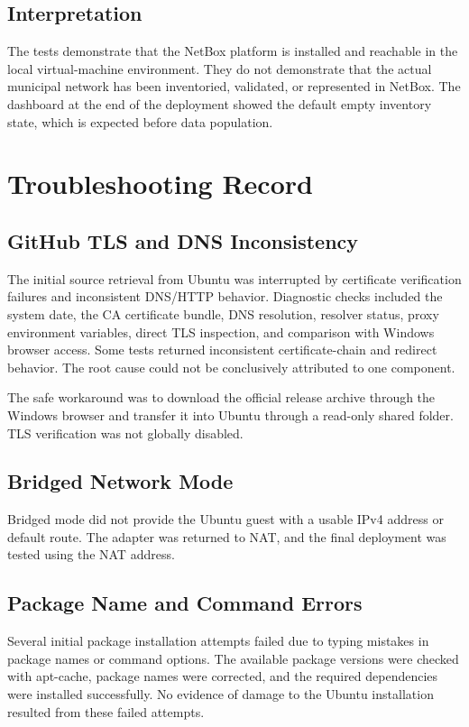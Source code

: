 \documentclass[11pt,a4paper,oneside]{report}
\begin{document}
\section{Interpretation}
The tests demonstrate that the NetBox platform is installed and reachable in the local virtual-machine environment. They do not demonstrate that the actual municipal network has been inventoried, validated, or represented in NetBox. The dashboard at the end of the deployment showed the default empty inventory state, which is expected before data population.

\chapter{Troubleshooting Record}

\section{GitHub TLS and DNS Inconsistency}
The initial source retrieval from Ubuntu was interrupted by certificate verification failures and inconsistent DNS/HTTP behavior. Diagnostic checks included the system date, the CA certificate bundle, DNS resolution, resolver status, proxy environment variables, direct TLS inspection, and comparison with Windows browser access. Some tests returned inconsistent certificate-chain and redirect behavior. The root cause could not be conclusively attributed to one component.

The safe workaround was to download the official release archive through the Windows browser and transfer it into Ubuntu through a read-only shared folder. TLS verification was not globally disabled.

\section{Bridged Network Mode}
Bridged mode did not provide the Ubuntu guest with a usable IPv4 address or default route. The adapter was returned to NAT, and the final deployment was tested using the NAT address.

\section{Package Name and Command Errors}
Several initial package installation attempts failed due to typing mistakes in package names or command options. The available package versions were checked with apt-cache, package names were corrected, and the required dependencies were installed successfully. No evidence of damage to the Ubuntu installation resulted from these failed attempts.
\end{document}
